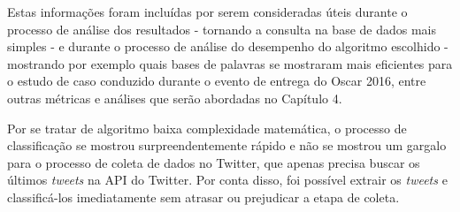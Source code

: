 Estas informações foram incluídas por serem consideradas úteis durante o processo de análise dos resultados - tornando a consulta na base de dados mais simples - e durante o processo de análise do desempenho do algoritmo escolhido - mostrando por exemplo quais bases de palavras se mostraram mais eficientes para o estudo de caso conduzido durante o evento de entrega do Oscar 2016, entre outras métricas e análises que serão abordadas no Capítulo 4. 

Por se tratar de algoritmo baixa complexidade matemática, o processo de classificação se mostrou surpreendentemente rápido e não se mostrou um gargalo para o processo de coleta de dados no Twitter, que apenas precisa buscar os últimos \textit{tweets} na API do Twitter. Por conta disso, foi possível extrair os \textit{tweets} e classificá-los imediatamente sem atrasar ou prejudicar a etapa de coleta.